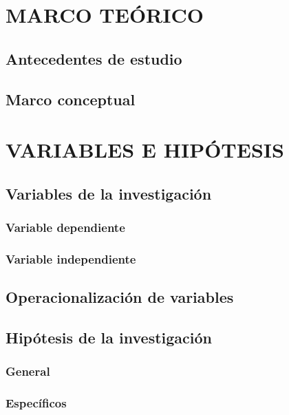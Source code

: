 \documentclass[12pt,a4paper,oneside]{report}
\begin{document}
\chapter{MARCO TEÓRICO}

\section{Antecedentes de estudio}

\section{Marco conceptual}



\chapter{VARIABLES E HIPÓTESIS}

\section{Variables de la investigación}

\subsection{Variable dependiente}

\subsection{Variable independiente}

\section{Operacionalización de variables}

\section{Hipótesis de la investigación}

\subsection{General}

\subsection{Específicos}
\end{document}
